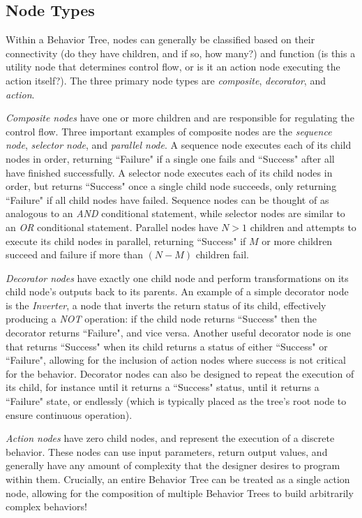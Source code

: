 \subsection{Node Types}
Within a Behavior Tree, nodes can generally be classified based on their connectivity (do they have children, and if so, how many?) and function (is this a utility node that determines control flow, or is it an action node executing the action itself?). The three primary node types are \emph{composite}, \emph{decorator}, and \emph{action}. 

\emph{Composite nodes} have one or more children and are responsible for regulating the control flow. Three important examples of composite nodes are the \emph{sequence node}, \emph{selector node}, and \emph{parallel node}. A sequence node executes each of its child nodes in order, returning ``Failure" if a single one fails and ``Success" after all have finished successfully. A selector node executes each of its child nodes in order, but returns ``Success" once a single child node succeeds, only returning ``Failure" if all child nodes have failed. Sequence nodes can be thought of as analogous to an \emph{AND} conditional statement, while selector nodes are similar to an \emph{OR} conditional statement. Parallel nodes have $N>1$ children and attempts to execute its child nodes in parallel, returning ``Success" if $M$ or more children succeed and failure if more than $(N-M)$ children fail.

\emph{Decorator nodes} have exactly one child node and perform transformations on its child node's outputs back to its parents. An example of a simple decorator node is the \emph{Inverter}, a node that inverts the return status of its child, effectively producing a \emph{NOT} operation: if the child node returns ``Success" then the decorator returns ``Failure", and vice versa. Another useful decorator node is one that returns ``Success" when its child returns a status of either ``Success" or ``Failure", allowing for the inclusion of action nodes where success is not critical for the behavior. Decorator nodes can also be designed to repeat the execution of its child, for instance until it returns a ``Success" status, until it returns a ``Failure" state, or endlessly (which is typically placed as the tree's root node to ensure continuous operation).

\emph{Action nodes} have zero child nodes, and represent the execution of a discrete behavior. These nodes can use input parameters, return output values, and generally have any amount of complexity that the designer desires to program within them. Crucially, an entire Behavior Tree can be treated as a single action node, allowing for the composition of multiple Behavior Trees to build arbitrarily complex behaviors!

